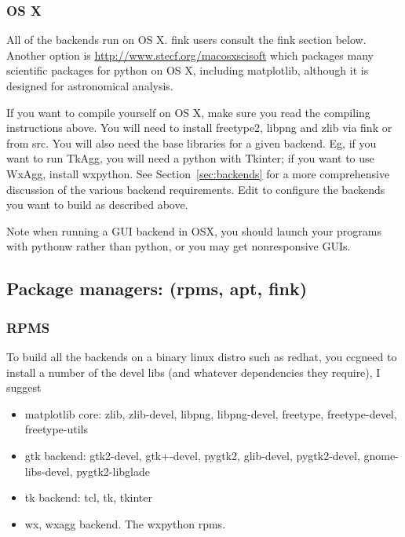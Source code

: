 \documentclass[twoside]{book}
\begin{document}
\subsubsection{OS X}
\label{sec:osx}

All of the backends run on OS X.  fink users consult the fink section
below.  Another option is \url{http://www.stecf.org/macosxscisoft}
which packages many scientific packages for python on OS X, including
matplotlib, although it is designed for astronomical analysis.

If you want to compile yourself on OS X, make sure you read the
compiling instructions above.  You will need to install freetype2,
libpng and zlib via fink or from src.  You will also need the base
libraries for a given backend.  Eg, if you want to run TkAgg, you will
need a python with Tkinter; if you want to use WxAgg, install
wxpython.  See Section~\ref{sec:backends} for a more comprehensive
discussion of the various backend requirements.  Edit 
to configure the backends you want to build as described above.

Note when running a GUI backend in OSX, you should launch your
programs with pythonw rather than python, or you may get
nonresponsive GUIs.

\subsection{Package managers: (rpms, apt, fink)}

\subsubsection{RPMS}
\label{sec:rpms}

To build all the backends on a binary linux distro such as redhat, you
ccgneed to install a number of the devel libs (and whatever dependencies
they require), I suggest
\begin{itemize}
  
\item matplotlib core: zlib, zlib-devel, libpng, libpng-devel,
  freetype, freetype-devel, freetype-utils
  
\item gtk backend: gtk2-devel, gtk+-devel, pygtk2, glib-devel,
  pygtk2-devel, gnome-libs-devel, pygtk2-libglade

\item tk backend: tcl, tk, tkinter

\item wx, wxagg backend.  The wxpython rpms.
\end{itemize}
\end{document}
